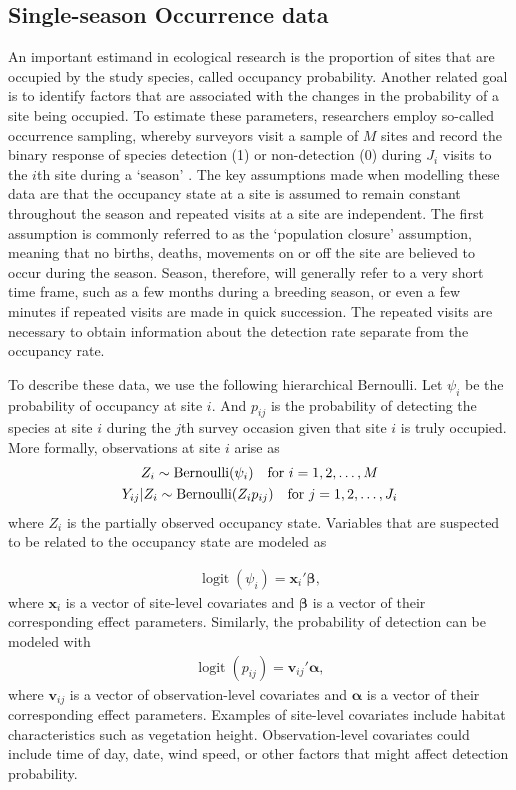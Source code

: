 \documentclass[article,shortnames]{jss}
\DeclareMathOperator{\logit}{logit}
\DeclareMathOperator{\Bern}{Bernoulli}
\begin{document}
\subsection{Single-season Occurrence data} 
\label{sec:occ}

An important estimand in ecological research is the
proportion of sites that are occupied by the study species, called
occupancy probability.  Another related goal is to identify factors that are
associated with the changes in the probability of a site being
occupied.  To estimate these parameters, researchers employ
so-called occurrence sampling, whereby surveyors visit a sample of $M$
sites and record the binary response of species detection (1) or
non-detection (0) during $J_{i}$ visits to the $i$th site during a
`season' \citep{MacKenzie2002}.  The key assumptions made
when modelling these data are that the occupancy state at a site is
assumed to remain constant throughout the season and repeated visits at
a site are independent.  The first assumption is commonly referred to as the
`population closure' assumption, meaning that no births, deaths, movements 
on or off the site are believed to occur during the season.  
Season, therefore, will generally refer to a very short time frame, such as 
a few months during a breeding season, or even a few minutes if repeated 
visits are made in quick succession.  The repeated visits are necessary to 
obtain information about the detection rate separate from the occupancy rate.  

To describe these data, we use the following hierarchical Bernoulli.  
Let $\psi_i$ be the probability of occupancy at site $i$.  And $p_{ij}$ is the
probability of detecting the species at site $i$ during the $j$th
survey occasion given that site $i$ is truly occupied.  More formally,
observations at site $i$ arise as
\begin{gather}
Z_i \sim \Bern(\psi_i) \text{\quad for $i=1,2,\dots,M$} \\
Y_{ij}|Z_i \sim \Bern(Z_i p_{ij})\text{\quad for $j=1,2,\dots,J_{i}$}
\end{gather}
where $Z_i$ is the partially observed occupancy state. Variables that are 
suspected to be related to the occupancy state are modeled as

\begin{gather}
  \logit(\psi_i) = \mathbf x_i' \mathbf \beta,
\end{gather}
where $\mathbf x_i$ is a vector of site-level covariates and $\mathbf \beta$
is a vector of their corresponding effect parameters.  Similarly, the
probability of detection can be modeled with
\begin{gather}
  \logit(p_{ij}) = \mathbf v_{ij}' \mathbf \alpha,
\end{gather}
where $\mathbf v_{ij}$ is a vector of observation-level covariates and
$\mathbf \alpha$ is a vector of their corresponding effect parameters.  
Examples of site-level covariates include habitat characteristics such as 
vegetation height. Observation-level covariates could include time of day, 
date, wind speed, or other factors that might affect detection probability. 
\end{document}
